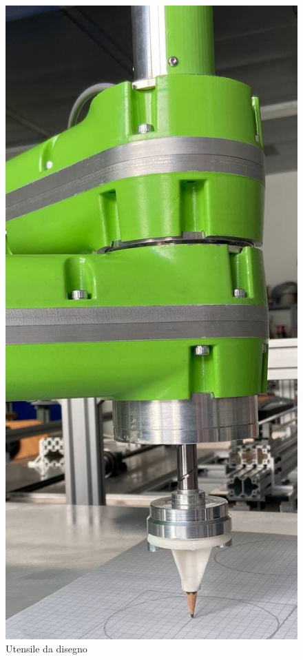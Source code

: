 \begin{figure}[ht]
	\begin{center}
		\includegraphics[scale=0.25]{Immagini/utensile}
		\caption{Utensile da disegno}
	\end{center}
\end{figure}
